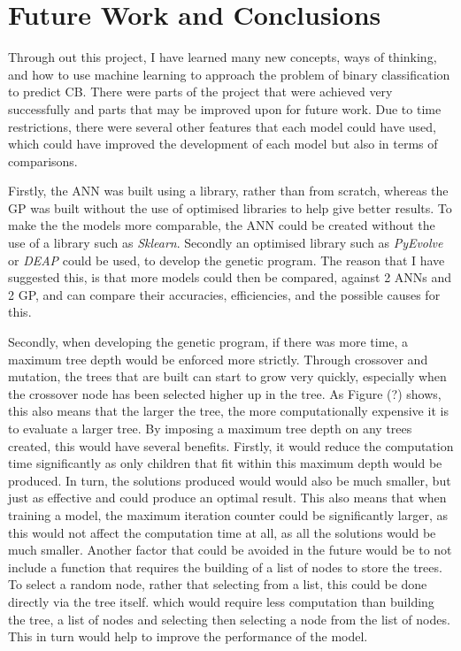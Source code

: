 \documentclass[11pt]{article}
\begin{document}
\section{Future Work and Conclusions}\label{sec:FWC}
Through out this project, I have learned many new concepts, ways of thinking, and how to use machine learning to approach the problem of binary classification to predict CB. There were parts of the project that were achieved very successfully and parts that may be improved upon for future work.  Due to time restrictions, there were several other features that each model could have used, which could have improved the development of each model but also in terms of comparisons. 

Firstly, the ANN was built using a library, rather than from scratch, whereas the GP was built without the use of optimised libraries to help give better results. To make the the models more comparable, the ANN could be created without the use of a library such as \textit{Sklearn}. Secondly an optimised library such as \textit{PyEvolve} or \textit{DEAP} could be used, to develop the genetic program. The reason that I have suggested this, is that more models could then be compared, against 2 ANNs and 2 GP, and can compare their accuracies, efficiencies, and the possible causes for this. 

Secondly, when developing the genetic program, if there was more time, a maximum tree depth would be enforced more strictly. Through crossover and mutation, the trees that are built can start to grow very quickly, especially when the crossover node has been selected higher up in the tree. As Figure (?) shows, this also means that the larger the tree, the more computationally expensive it is to evaluate a larger tree. By imposing a maximum tree depth on any trees created, this would have several benefits. Firstly, it would reduce the computation time significantly as only children that fit within this maximum depth would be produced. In turn, the solutions produced would would also be much smaller, but just as effective and could produce an optimal result. This also means that when training a model, the maximum iteration counter could be significantly larger, as this would not affect the computation time at all, as all the solutions would be much smaller.
Another factor that could be avoided in the future would be to not include a function that requires the building of a list of nodes to store the trees. To select a random node, rather that selecting from a list, this could be done directly via the tree itself. which would require less computation than building the tree, a list of nodes and selecting then selecting a node from the list of nodes. This in turn would help to improve the performance of the model.  
\end{document}

